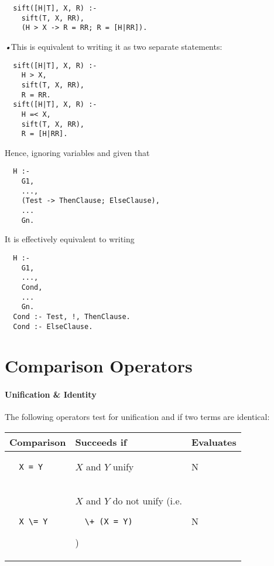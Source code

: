 \documentclass{article}
\begin{document}
\begin{multicols}{2}
  \begin{lstlisting}
  sift([H|T], X, R) :-
    sift(T, X, RR),
    (H > X -> R = RR; R = [H|RR]).
  \end{lstlisting}
  
  \noindent \emph{•}This is equivalent to writing it as two separate statements:
  
  \begin{lstlisting}
  sift([H|T], X, R) :-
    H > X,
    sift(T, X, RR),
    R = RR.
  sift([H|T], X, R) :-
    H =< X,
    sift(T, X, RR),
    R = [H|RR].
  \end{lstlisting}
  
  Hence, ignoring variables and given that
  
  \begin{lstlisting}
  H :-
    G1,
    ...,
    (Test -> ThenClause; ElseClause),
    ...
    Gn.
  \end{lstlisting}
  
  \noindent It is effectively equivalent to writing
  
  \begin{lstlisting}
  H :-
    G1,
    ...,
    Cond,
    ...
    Gn.
  Cond :- Test, !, ThenClause.
  Cond :- ElseClause.
  \end{lstlisting}
  
  \section{Comparison Operators}
  
  \paragraph{Unification \& Identity} The following operators test for unification and if two terms are identical:
  
  \noindent \begin{tabular}{ | p{2cm} | p{4cm} | p{1.4cm} | }
  \hline
  \bf Comparison & \bf Succeeds if & \bf Evaluates \\
  \hline
  
  \begin{lstlisting}
  X = Y
  \end{lstlisting} & $X$ and $Y$ unify & N \\
  \hline  
  
  \begin{lstlisting}
  X \= Y
  \end{lstlisting} & $X$ and $Y$ do not unify (i.e. 
  \begin{lstlisting}
  \+ (X = Y)
  \end{lstlisting}) & N \\
  \hline
  

\end{tabular}
\end{multicols}
\end{document}

